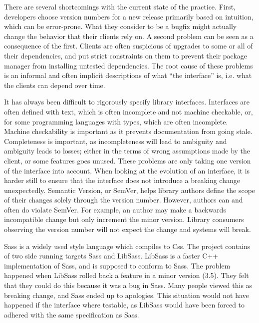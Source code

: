 There are several shortcomings with the current state of the practice.
%
First, developers choose version numbers for a new release primarily
based on intuition, which can be error-prone. What they consider to be
a bugfix might actually change the behavior that their clients rely
on.
%
A second problem can be seen as a consequence of the first. Clients
are often suspicious of upgrades to some or all of their dependencies,
and put strict constraints on them to prevent their package manager
from installing untested dependencies. 
%
%
The root cause of these problems is an informal and often implicit
descriptions of what ``the interface'' is, i.e. what the clients can
depend over time.


It has always been difficult to rigorously specify library interfaces.
Interfaces are often defined with text, which is often incomplete and not
machine checkable, or, for some programming languages with types, which are
often incomplete. Machine checkability is important as it prevents
documentation from going stale. Completeness is important, as incompleteness
will lead to ambiguity and ambiguity leads to losses; either in the terms of
wrong assumptions made by the client, or some features goes unused. These
problems are only taking one version of the interface into account. When
looking at the evolution of an interface, it is harder still to ensure that the
interface does not introduce a breaking change unexpectedly. Semantic Version, or
SemVer, helps library authors define the scope of their changes solely through
the version number. However, authors can and often do violate SemVer. For
example, an author may make a backwards incompatible change but only increment
the minor version. Library consumers observing the version number will not
expect the change and systems will break. 

Sass is a widely used style language which compiles to Css. The project
contains of two side running targets Sass and LibSass. LibSass is a 
faster C++ implementation of Sass, and is supposed to conform to Sass. The
problem happened when LibSass rolled back a feature in a minor version (3.5). 
They felt that they could do this because it was a bug in Sass. Many people 
viewed this as breaking change, and Sass ended up to apologies. This situation
would not have happened if the interface where testable, as LibSass would have
been forced to adhered with the same specification as Sass\cite{libsass}. 
%


